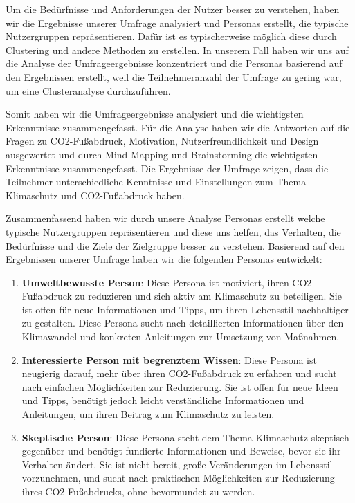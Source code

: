 Um die Bedürfnisse und Anforderungen der Nutzer besser zu verstehen, haben wir die Ergebnisse unserer Umfrage analysiert und Personas erstellt, die typische Nutzergruppen repräsentieren. Dafür ist es typischerweise möglich diese durch Clustering und andere Methoden zu erstellen. In unserem Fall haben wir uns auf die Analyse der Umfrageergebnisse konzentriert und die Personas basierend auf den Ergebnissen erstellt, weil die Teilnehmeranzahl der Umfrage zu gering war, um eine Clusteranalyse durchzuführen.

Somit haben wir die Umfrageergebnisse analysiert und die wichtigsten Erkenntnisse zusammengefasst. Für die Analyse haben wir die Antworten auf die Fragen zu CO2-Fußabdruck, Motivation, Nutzerfreundlichkeit und Design ausgewertet und durch Mind-Mapping und Brainstorming die wichtigsten Erkenntnisse zusammengefasst. Die Ergebnisse der Umfrage zeigen, dass die Teilnehmer unterschiedliche Kenntnisse und Einstellungen zum Thema Klimaschutz und CO2-Fußabdruck haben.

Zusammenfassend haben wir durch unsere Analyse Personas erstellt welche typische Nutzergruppen repräsentieren und diese uns helfen, das Verhalten, die Bedürfnisse und die Ziele der Zielgruppe besser zu verstehen. Basierend auf den Ergebnissen unserer Umfrage haben wir die folgenden Personas entwickelt:

\begin{enumerate}
    \item \textbf{Umweltbewusste Person}: Diese Persona ist motiviert, ihren CO2-Fußabdruck zu reduzieren und sich aktiv am Klimaschutz zu beteiligen. Sie ist offen für neue Informationen und Tipps, um ihren Lebensstil nachhaltiger zu gestalten. Diese Persona sucht nach detaillierten Informationen über den Klimawandel und konkreten Anleitungen zur Umsetzung von Maßnahmen.
    \item \textbf{Interessierte Person mit begrenztem Wissen}: Diese Persona ist neugierig darauf, mehr über ihren CO2-Fußabdruck zu erfahren und sucht nach einfachen Möglichkeiten zur Reduzierung. Sie ist offen für neue Ideen und Tipps, benötigt jedoch leicht verständliche Informationen und Anleitungen, um ihren Beitrag zum Klimaschutz zu leisten.

    \item \textbf{Skeptische Person}: Diese Persona steht dem Thema Klimaschutz skeptisch gegenüber und benötigt fundierte Informationen und Beweise, bevor sie ihr Verhalten ändert. Sie ist nicht bereit, große Veränderungen im Lebensstil vorzunehmen, und sucht nach praktischen Möglichkeiten zur Reduzierung ihres CO2-Fußabdrucks, ohne bevormundet zu werden.
\end{enumerate}

